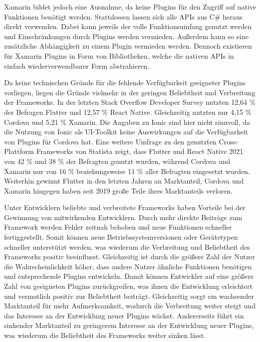 Xamarin bildet jedoch eine Ausnahme, da keine Plugins für den Zugriff auf native Funktionen benötigt werden.
Stattdessen lassen sich alle \acp{API} aus C\# heraus direkt verwenden.
Dabei kann jeweils der volle Funktionsumfang genutzt werden und Einschränkungen durch Plugins werden vermieden.
Außerdem kann so eine zusätzliche Abhängigkeit zu einem Plugin vermieden werden.
Dennoch existieren für Xamarin Plugins in Form von Bibliotheken, welche die nativen \acp{API} in einfach wiederverwendbarer Form abstrahieren.


Da keine technischen Gründe für die fehlende Verfügbarkeit geeigneter Plugins vorliegen, liegen die Gründe vielmehr in der geringen Beliebtheit und Verbreitung der Frameworks.
In der letzten Stack Overflow Developer Survey \cite{Stackoverflow_2022} nutzten 12,64 \% der Befragen Flutter und 12,57 \% React Native.
Gleichzeitig nutzten nur 4,15 \% Cordova und 5,21 \% Xamarin.
Die Angaben zu Ionic sind hier nicht sinnvoll, da die Nutzung von Ionic als UI-Toolkit keine Auswirkungen auf die Verfügbarkeit von Plugins für Cordova hat.
Eine weitere Umfrage zu den genutzten Cross-Plattform Frameworks von Statista \cite{Statista_UsedCrossPlatformFrameworks} zeigt, dass Flutter und React Native 2021 von 42 \% und 38 \% der Befragten genutzt wurden, während Cordova und Xamarin nur von 16 \% beziehungsweise 11 \% aller Befragten eingesetzt wurden.
Weiterhin gewinnt Flutter in den letzten Jahren an Marktanteil, Cordova und Xamarin hingegen haben seit 2019 große Teile ihres Marktanteils verloren.

Unter Entwicklern beliebte und verbreitete Frameworks haben Vorteile bei der Gewinnung von mitwirkenden Entwicklern.
Durch mehr direkte Beiträge zum Framework werden Fehler zeitnah behoben und neue Funktionen schneller fertiggestellt.
Somit können neue Betriebssystemversionen oder Gerätetypen schneller unterstützt werden, was wiederum die Verbreitung und Beliebtheit des Frameworks positiv beeinflusst.
Gleichzeitig ist durch die größere Zahl der Nutzer die Wahrscheinlichkeit höher, dass andere Nutzer ähnliche Funktionen benötigen und entsprechende Plugins entwickeln.
Damit können Entwickler auf eine größere Zahl von geeigneten Plugins zurückgreifen, was ihnen die Entwicklung erleichtert und vermutlich positiv zur Beliebtheit beiträgt.
Gleichzeitig sorgt ein wachsender Marktanteil für mehr Aufmerksamkeit, wodurch die Verbreitung weiter steigt und das Interesse an der Entwicklung neuer Plugins wächst.
Andererseits führt ein sinkender Marktanteil zu geringerem Interesse an der Entwicklung neuer Plugins, was wiederum die Beliebtheit des Frameworks weiter sinken lässt.

